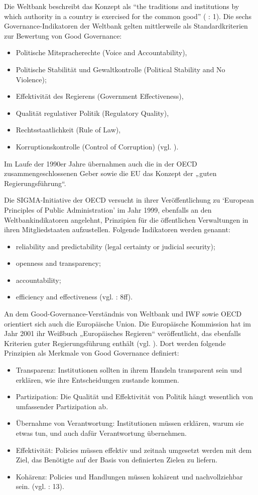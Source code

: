 Die Weltbank beschreibt das Konzept als “the traditions and institutions by which authority in a country is exercised for the common good” (\cite{weltbank} : 1). Die sechs Governance-Indikatoren der Weltbank gelten mittlerweile als Standardkriterien zur Bewertung von Good Governance: 
\begin{itemize} \itemsep1pt \parskip0pt 
\item Politische Mitspracherechte (Voice and Accountability),
\item Politische Stabilität und Gewaltkontrolle (Political Stability and No Violence);
\item Effektivität des Regierens (Government Effectiveness),
\item Qualität regulativer Politik (Regulatory Quality),
\item Rechtsstaatlichkeit (Rule of Law),
\item Korruptionskontrolle (Control of Corruption) (vgl. \cite{kaufmann}).
\end{itemize}
Im Laufe der 1990er Jahre übernahmen auch die in der OECD zusammengeschlossenen Geber sowie die EU das Konzept der „guten Regierungsführung“.\par
Die SIGMA-Initiative der OECD versucht in ihrer Veröffentlichung zu ‘European Principles of Public Administration’ im Jahr 1999, ebenfalls an den Weltbankindikatoren angelehnt, Prinzipien für die öffentlichen Verwaltungen in ihren Mitgliedstaaten aufzustellen. Folgende Indikatoren werden genannt: 
\begin{itemize} \itemsep1pt \parskip0pt 
\item reliability and predictability (legal certainty or judicial security); 
\item openness and transparency; 
\item accountability; 
\item efficiency and effectiveness (vgl. \cite{oecd99} : 8ff).
\end{itemize}
An dem Good-Governance-Verständnis von Weltbank und IWF sowie OECD orientiert sich auch die Europäische Union. Die Europäische Kommission hat im Jahr 2001 ihr Weißbuch „Europäisches Regieren“ veröffentlicht, das ebenfalls Kriterien guter Regierungsführung enthält (vgl. \cite{czada2010}). Dort werden folgende Prinzipien als Merkmale von Good Governance definiert:
\begin{itemize} \itemsep1pt \parskip0pt 
\item Transparenz: Institutionen sollten in ihrem Handeln transparent sein und erklären, wie ihre Entscheidungen zustande kommen.
\item Partizipation: Die Qualität und Effektivität von Politik hängt wesentlich von umfassender Partizipation ab.
\item Übernahme von Verantwortung: Institutionen müssen erklären, warum sie etwas tun, und auch dafür Verantwortung übernehmen.
\item Effektivität: Policies müssen effektiv und zeitnah umgesetzt werden mit dem Ziel, das Benötigte auf der Basis von definierten Zielen zu liefern.
\item Kohärenz: Policies und Handlungen müssen kohärent und nachvollziehbar sein.
(vgl. \cite{euko01} : 13).
\end{itemize}
